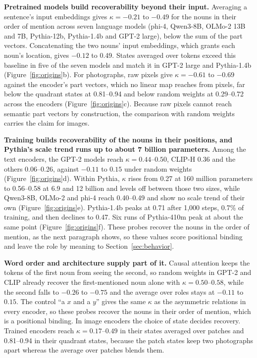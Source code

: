 \documentclass[10pt]{article}
\theoremstyle{plain}
\theoremstyle{remark}
\begin{document}
\textbf{Pretrained models build recoverability beyond their input.} Averaging a sentence's input embeddings gives $\kappa = -0.21$ to $-0.49$ for the nouns in their order of mention across seven language models (phi-4, Qwen3-8B, OLMo-2 13B and 7B, Pythia-12b, Pythia-1.4b and GPT-2 large), below the sum of the part vectors. Concatenating the two nouns' input embeddings, which grants each noun's location, gives $-0.12$ to 0.49. States averaged over tokens exceed this baseline in five of the seven models and match it in GPT-2 large and Pythia-1.4b (Figure~\ref{fig:origins}b). For photographs, raw pixels give $\kappa = -0.61$ to $-0.69$ against the encoder's part vectors, which no linear map reaches from pixels, far below the quadrant states at 0.81--0.94 and below random weights at 0.29--0.72 across the encoders (Figure~\ref{fig:origins}c). Because raw pixels cannot reach semantic part vectors by construction, the comparison with random weights carries the claim for images.

\textbf{Training builds recoverability of the nouns in their positions, and Pythia's scale trend runs up to about 7 billion parameters.} Among the text encoders, the GPT-2 models reach $\kappa = 0.44$--$0.50$, CLIP-H 0.36 and the others 0.06--0.26, against $-0.11$ to $0.15$ under random weights (Figure~\ref{fig:origins}d). Within Pythia, $\kappa$ rises from 0.27 at 160 million parameters to 0.56--0.58 at 6.9 and 12 billion and levels off between those two sizes, while Qwen3-8B, OLMo-2 and phi-4 reach 0.40--0.49 and show no scale trend of their own (Figure~\ref{fig:origins}e). Pythia-1.4b peaks at 0.71 after 1{,}000 steps, 0.7\% of training, and then declines to 0.47. Six runs of Pythia-410m peak at about the same point (Figure~\ref{fig:origins}f). These probes recover the nouns in the order of mention, as the next paragraph shows, so these values score positional binding and leave the role by meaning to Section~\ref{sec:behavior}.

\textbf{Word order and architecture supply part of it.} Causal attention keeps the tokens of the first noun from seeing the second, so random weights in GPT-2 and CLIP already recover the first-mentioned noun alone with $\kappa = 0.50$--$0.58$, while the second falls to $-0.26$ to $-0.75$ and the average over roles stays at $-0.11$ to $0.15$. The control ``a $x$ and a $y$'' gives the same $\kappa$ as the asymmetric relations in every encoder, so these probes recover the nouns in their order of mention, which is a positional binding. In image encoders the choice of state decides recovery. Trained encoders reach $\kappa = 0.17$--$0.49$ in their states averaged over patches and 0.81--0.94 in their quadrant states, because the patch states keep two photographs apart whereas the average over patches blends them.
\end{document}
